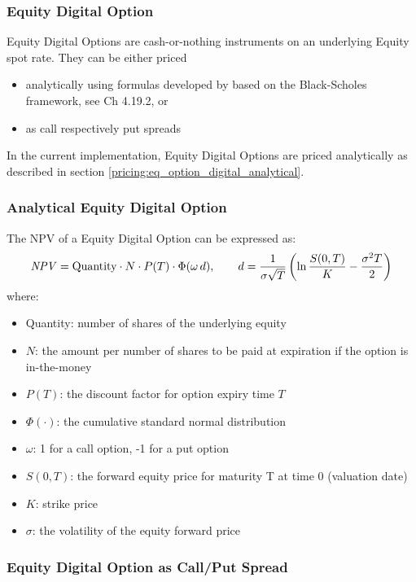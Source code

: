 \subsubsection{Equity Digital Option}
\label{pricing:eq_digitaloption}

Equity Digital Options are cash-or-nothing instruments on an underlying Equity spot rate.
They can be either priced 
\begin{itemize}
\item analytically using formulas developed by \cite{Rubinstein_1991} 
based on the Black-Scholes framework, see \cite{Haug_1997} Ch 4.19.2, or
\item as call respectively put spreads
\end{itemize}

In the current implementation, Equity Digital Options are priced analytically as described in section
\ref{pricing:eq_option_digital_analytical}.

\subsubsection*{Analytical Equity Digital Option}\label{pricing:eq_option_digital_analytical}

The NPV of a Equity Digital Option can be expressed as:
$$
\mathit{NPV} = \mbox{Quantity}\cdot N \cdot P(T)\cdot \Phi(\omega\,d), \qquad d = \frac{1}{\sigma\sqrt{T}}\left(\ln\frac{S(0,T)}{K} - \frac{\sigma^2 T}{2}\right)
$$
where:
\begin{itemize}
\item Quantity: number of shares of the underlying equity
\item $N$: the amount per number of shares to be paid at expiration if the option is in-the-money
\item $P(T)$: the discount factor for option expiry time $T$
\item $\Phi(\cdot)$: the cumulative standard normal distribution
\item $\omega$: 1 for a call option, -1 for a put option
\item $S(0,T)$: the forward equity price for maturity T at time 0 (valuation date)
\item $K$: strike price
\item $\sigma$: the volatility of the equity forward price
\end{itemize}

\subsubsection*{Equity Digital Option as Call/Put Spread}\label{pricing:eq_option_digital_callspread}


